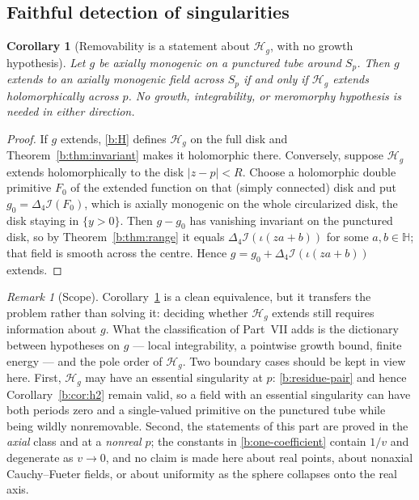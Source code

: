 \documentclass[11pt,a4paper]{article}
\numberwithin{equation}{section}
\newtheorem{corollary}[theorem]{Corollary}
\theoremstyle{definition}
\theoremstyle{remark}
\newtheorem{remark}[theorem]{Remark}
\theoremstyle{plain}
\newcommand{\HH}{\mathbb H}
\newcommand{\lap}{\Delta_4}
\newcommand{\I}{\mathcal I}
\newcommand{\Sp}{S_{p}}
\newcommand{\Hg}{\mathcal H_{g}}      %
\newcommand{\abs}[1]{\lvert #1\rvert}
\begin{document}
\subsection{Faithful detection of singularities}
\label{b:sub:detect}

\begin{corollary}[Removability is a statement about $\Hg$, with no growth
hypothesis]
\label{b:cor:removable-iff}
Let $g$ be axially monogenic on a punctured tube around $\Sp$.  Then $g$
extends to an axially monogenic field across $\Sp$ if and only if $\Hg$
extends holomorphically across $p$.  No growth, integrability, or
meromorphy hypothesis is needed in either direction.
\end{corollary}

\begin{proof}
If $g$ extends, \eqref{b:H} defines $\Hg$ on the full disk and
Theorem~\ref{b:thm:invariant} makes it holomorphic there.  Conversely,
suppose $\Hg$ extends holomorphically to the disk $\abs{z-p}<R$.  Choose a
holomorphic double primitive $F_0$ of the extended function on that
(simply connected) disk and put $g_0=\lap\I(F_0)$, which is axially monogenic
on the whole circularized disk, the disk staying in $\{y>0\}$.  Then
$g-g_0$ has vanishing invariant on the punctured disk, so by
Theorem~\ref{b:thm:range} it equals $\lap\I(\iota(za+b))$ for some
$a,b\in\HH$; that field is smooth across the centre.  Hence $g=g_0+
\lap\I(\iota(za+b))$ extends.
\end{proof}

\begin{remark}[Scope]
\label{b:rem:scope}
Corollary~\ref{b:cor:removable-iff} is a clean equivalence, but it transfers
the problem rather than solving it: deciding whether $\Hg$ extends still
requires information about $g$.  What the classification of Part~VII adds is
the dictionary between hypotheses on $g$ --- local integrability, a pointwise
growth bound, finite energy --- and the pole order of $\Hg$.  Two boundary
cases should be kept in view here.  First, $\Hg$ may have an essential
singularity at $p$: \eqref{b:residue-pair} and hence
Corollary~\ref{b:cor:h2} remain valid, so a field with an essential
singularity can have both periods zero and a single-valued primitive on the
punctured tube while being wildly nonremovable.  Second, the statements of
this part are proved in the \emph{axial} class and at a \emph{nonreal}
$p$; the constants in \eqref{b:one-coefficient} contain $1/v$ and degenerate
as $v\to0$, and no claim is made here about real points, about nonaxial
Cauchy--Fueter fields, or about uniformity as the sphere collapses onto the
real axis.
\end{remark}
\end{document}
